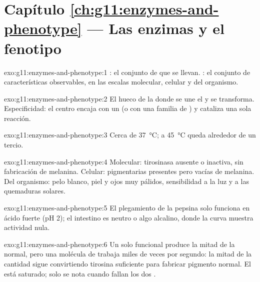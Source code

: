 \section*{Capítulo \ref{ch:g11:enzymes-and-phenotype} --- Las enzimas y el fenotipo}

\begin{solution}{exo:g11:enzymes-and-phenotype:1}
: el conjunto de  que se llevan. : el conjunto de
características observables, en las escalas molecular, celular y del
organismo.
\end{solution}

\begin{solution}{exo:g11:enzymes-and-phenotype:2}
El hueco de la  donde se une el  y se transforma.
Especificidad: el centro encaja con un  (o con una familia de
) y cataliza una sola reacción.
\end{solution}

\begin{solution}{exo:g11:enzymes-and-phenotype:3}
Cerca de \qty{37}{\celsius}; a \qty{45}{\celsius} queda alrededor de un
tercio.
\end{solution}

\begin{solution}{exo:g11:enzymes-and-phenotype:4}
Molecular: tirosinasa ausente o inactiva, sin fabricación de melanina.
Celular:  pigmentarias presentes pero vacías de melanina. Del
organismo: pelo blanco, piel y ojos muy pálidos, sensibilidad a la luz
y a las quemaduras solares.
\end{solution}

\begin{solution}{exo:g11:enzymes-and-phenotype:5}
El plegamiento de la pepsina solo funciona en ácido fuerte (pH 2); el
intestino es neutro o algo alcalino, donde la curva muestra actividad
nula.
\end{solution}

\begin{solution}{exo:g11:enzymes-and-phenotype:6}
Un solo  funcional produce la mitad de la  normal, pero una
molécula de  trabaja miles de veces por segundo: la mitad de la
cantidad sigue convirtiendo tirosina suficiente para fabricar pigmento
normal. El  está saturado; solo se nota cuando fallan los dos
.
\end{solution}

